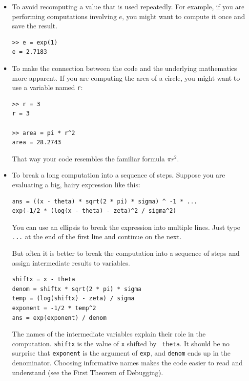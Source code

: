 \documentclass{book}
\begin{document}
\begin{itemize}

\item To avoid recomputing a value that is used repeatedly.  For
example, if you are performing computations involving $e$, you might
want to compute it once and save the result.

\begin{verbatim}
>> e = exp(1)
e = 2.7183
\end{verbatim}


\item To make the connection between the code and the underlying
mathematics more apparent.  If you are computing the area of a circle,
you might want to use a variable named {\tt r}:

\begin{verbatim}
>> r = 3
r = 3

>> area = pi * r^2
area = 28.2743
\end{verbatim}

That way your code resembles the familiar formula $\pi r^2$.

\item To break a long computation into a sequence of steps.
Suppose you are evaluating a big, hairy expression like this:

\begin{verbatim}
ans = ((x - theta) * sqrt(2 * pi) * sigma) ^ -1 * ...
exp(-1/2 * (log(x - theta) - zeta)^2 / sigma^2)
\end{verbatim}

You can use an ellipsis to break the expression into multiple lines.
Just type {\tt ...} at the end of the first line and continue on the
next.

But often it is better to break the computation into a sequence of
steps and assign intermediate results to variables.

\begin{verbatim}
shiftx = x - theta
denom = shiftx * sqrt(2 * pi) * sigma
temp = (log(shiftx) - zeta) / sigma
exponent = -1/2 * temp^2
ans = exp(exponent) / denom
\end{verbatim}

The names of the intermediate variables explain their role in the
computation.  {\tt shiftx} is the value of {\tt x} shifted by {\tt
theta}.  It should be no surprise that {\tt exponent} is the argument
of {\tt exp}, and {\tt denom} ends up in the denominator.  Choosing
informative names makes the code easier to read and understand (see
the First Theorem of Debugging).

\end{itemize}
\end{document}
